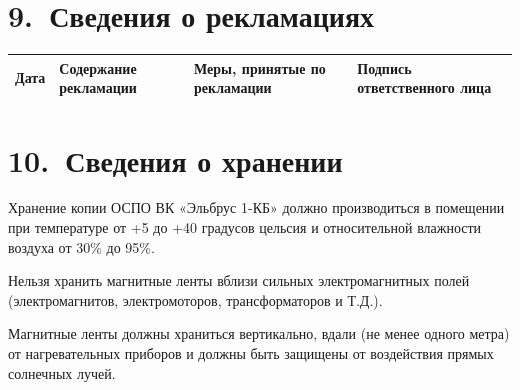 \documentclass[11pt,a4paper]{article}
\begin{document}
\section*{9.~Сведения о рекламациях}
\begin{center}\small\begin{tabularx}{\linewidth}{|>{\raggedright\arraybackslash\hsize=0.424\hsize}X|>{\raggedright\arraybackslash\hsize=1.030\hsize}X|>{\raggedright\arraybackslash\hsize=1.394\hsize}X|>{\raggedright\arraybackslash\hsize=1.152\hsize}X|}\hline
\small\bfseries\hspace{0pt}Дата & \small\bfseries\hspace{0pt}Содержание рекламации & \small\bfseries\hspace{0pt}Меры, принятые по рекламации & \small\bfseries\hspace{0pt}Подпись ответственного лица \\ \hline
\end{tabularx}\end{center}

\section*{10.~Сведения о хранении}
Хранение копии ОСПО ВК «Эльбрус 1-КБ» должно производиться в помещении при температуре от +5 до +40 градусов цельсия и относительной влажности воздуха от 30\% до 95\%.

Нельзя хранить магнитные ленты вблизи сильных электромагнитных полей (электромагнитов, электромоторов, трансформаторов и Т.Д.).

Магнитные ленты должны храниться вертикально, вдали (не менее одного метра) от нагревательных приборов и должны быть защищены от воздействия прямых солнечных лучей.
\end{document}
